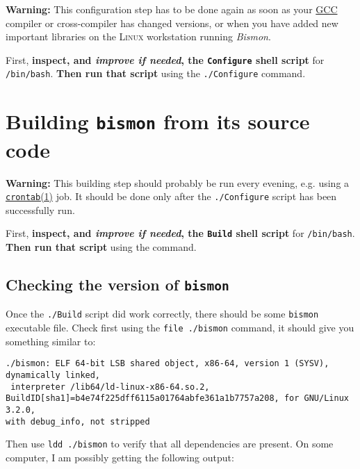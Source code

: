 \begin{appendices}
\textbf{\large Warning:} This configuration step has to be done again as soon
as your \href{http://gcc.gnu.org/}{GCC} compiler or cross-compiler has
changed versions, or when you have added new important libraries on
the \textsc{Linux} workstation running \emph{Bismon}.

First, \textbf{inspect, and \emph{improve if needed}, the \texttt{Configure} shell
script} for \texttt{/bin/bash}. \textbf{Then run that script} using the
\texttt{./Configure} command.

\section{Building \texttt{bismon} from its source code}
\label{sec:building-bismon}

\textbf{\large Warning:} This building step should probably be run
every evening, e.g. using a
\href{https://man7.org/linux/man-pages/man1/crontab.1.html}{\texttt{crontab}(1)}
job. It should be done only after the \texttt{./Configure} script has
been successfully run.

First, \textbf{inspect, and \emph{improve if needed}, the \texttt{Build} shell
script} for \texttt{/bin/bash}. \textbf{Then run that script} using the
\textcolor{\texttt{./Build}} command. 


\subsection{Checking the version of \texttt{bismon}}

Once the \texttt{./Build} script did work correctly, there should be
some \texttt{bismon} executable file. Check first using the
\texttt{file ./bismon} command, it should give you something similar
to:

\begin{verbatim}
./bismon: ELF 64-bit LSB shared object, x86-64, version 1 (SYSV), dynamically linked,
 interpreter /lib64/ld-linux-x86-64.so.2,
BuildID[sha1]=b4e74f225dff6115a01764abfe361a1b7757a208, for GNU/Linux 3.2.0,
with debug_info, not stripped
\end{verbatim}

Then use \texttt{ldd ./bismon} to verify that all dependencies are
present. On some computer, I am possibly getting the following output:


\end{appendices}
